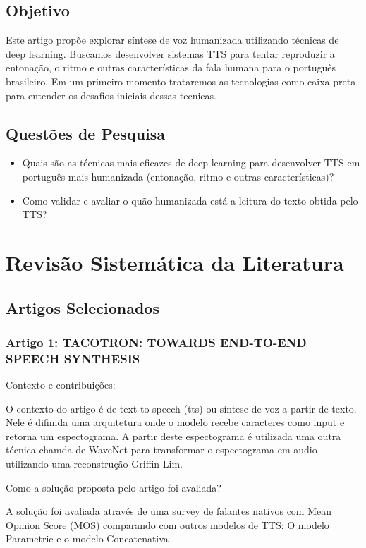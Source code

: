 \documentclass[a4paper,12pt]{article}
\begin{document}
		\subsection{Objetivo}
		Este artigo propõe explorar síntese de voz humanizada utilizando técnicas de deep learning. Buscamos desenvolver sistemas TTS para tentar reproduzir a entonação, o ritmo e outras características da fala humana para o português brasileiro. Em um primeiro momento trataremos as tecnologias como caixa preta para entender os desafios iniciais dessas tecnicas.

		\subsection{Questões de Pesquisa}
		\begin{itemize}
			\item Quais são as técnicas mais eficazes de deep learning para desenvolver TTS em português mais humanizada (entonação, ritmo e outras características)?
			\item Como validar e avaliar o quão humanizada está a leitura do texto obtida pelo TTS?
		\end{itemize}
	\section{Revisão Sistemática da Literatura}
		\subsection{Artigos Selecionados}
			\subsubsection{Artigo 1: TACOTRON: TOWARDS END-TO-END SPEECH SYNTHESIS}
			
			Contexto e contribuições:
						
			O contexto do artigo é de text-to-speech (tts) ou síntese de voz a partir de texto. Nele é difinida uma arquitetura onde o modelo recebe caracteres como input e retorna um espectograma. A partir deste espectograma é utilizada uma outra técnica chamda de WaveNet \cite{oord2016wavenet} para transformar o espectograma em audio utilizando uma reconstrução Griffin-Lim.
			
			Como a solução proposta pelo artigo foi avaliada?
			
			A solução foi avaliada através de uma survey de falantes nativos com Mean Opinion Score (MOS) comparando com outros modelos de TTS: O modelo Parametric \cite{zen2016parametric} e o modelo Concatenativa \cite{goncalvo2016concatenative}.
			
\end{document}
